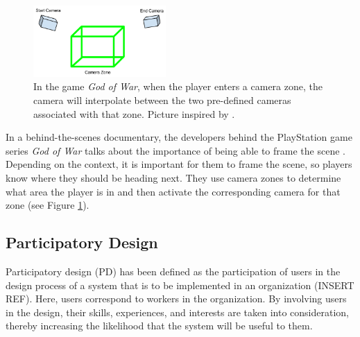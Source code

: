 

\begin{figure}[htbp]
\centering
\includegraphics[width=0.45\textwidth]{Pics/gow_cameraZones2}
\caption{In the game \textit{God of War}, when the player enters a camera zone, the camera will interpolate between the two pre-defined cameras associated with that zone. Picture inspired by \protect\cite{gow_camera}.}
\label{fig:gow_zones}
\end{figure}

In a behind-the-scenes documentary, the developers behind the PlayStation game series \textit{God of War} talks about the importance of being able to frame the scene \cite{gow_camera}. Depending on the context, it is important for them to frame the scene, so players know where they should be heading next. They use camera zones to determine what area the player is in and then activate the corresponding camera for that zone (see Figure \ref{fig:gow_zones}).




\subsection{Participatory Design}
Participatory design (PD) has been defined as the participation of users in the design process of a system that is to be implemented in an organization (INSERT REF). Here, users correspond to workers in the organization. By involving users in the design, their skills, experiences, and interests are taken into consideration, thereby increasing the likelihood that the system will be useful to them.

